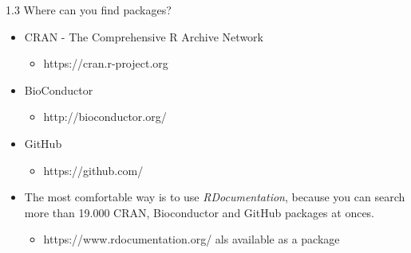 \documentclass[11pt,a4paper]{beamer}
\begin{document}
\begin{frame}[t]{1.3 Where can you find packages?}
	
		
	\begin{itemize}
		\item CRAN -  The Comprehensive R Archive Network 
		
			\begin{itemize}
				\item[] https://cran.r-project.org 
			\end{itemize}
		
		\item BioConductor
		
			\begin{itemize}
				\item[] http://bioconductor.org/
			\end{itemize}
	
		\item GitHub
	
			\begin{itemize}
				\item[] https://github.com/
			\end{itemize}
		
		\item The most comfortable way is to use \textit{RDocumentation}, because you can search more than 19.000 CRAN, Bioconductor and GitHub packages at onces.
	
			\begin{itemize}
				\item[] https://www.rdocumentation.org/ als available as a package
			\end{itemize}
			
	\end{itemize}
	
\end{frame}




\end{document}

